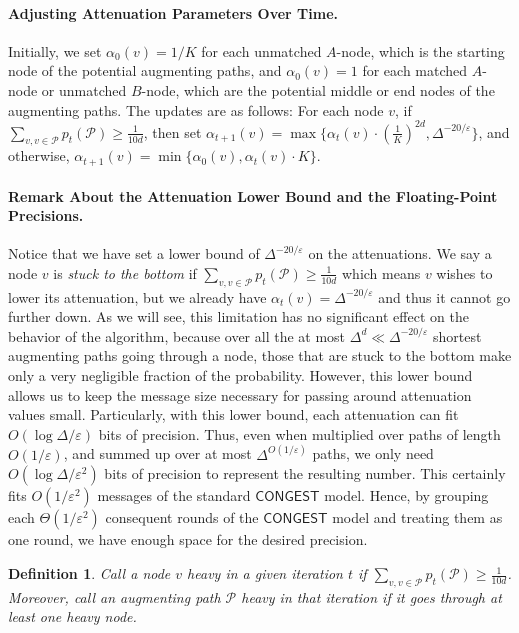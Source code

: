 \documentclass[11pt]{article}
\newtheorem{definition}[theorem]{Definition}
\newcommand{\eps}{\varepsilon}
\begin{document}
\paragraph{Adjusting Attenuation Parameters Over Time.} Initially, we set $\alpha_{0}(v)=1/K$ for each unmatched $A$-node, which is the starting node of the potential augmenting paths, and $\alpha_{0}(v)=1$ for each matched $A$-node or unmatched $B$-node, which are the potential middle or end nodes of the augmenting paths. The updates are as follows: For each node $v$, if $\sum_{v, v\in \mathcal{P}} p_{t}(\mathcal{P}) \geq \frac{1}{10d}$, then set $\alpha_{t+1}(v) = \max\{\alpha_{t}(v) \cdot (\frac{1}{K})^{2d}, \Delta^{-20/\eps}\}$, and otherwise, $\alpha_{t+1}(v) = \min\{\alpha_{0}(v), \alpha_{t}(v) \cdot K\}$.


\paragraph{Remark About the Attenuation Lower Bound and the Floating-Point Precisions.} Notice that we have set a lower bound of $\Delta^{-20/\eps}$ on the attenuations. We say a node $v$ is \emph{stuck to the bottom} if $\sum_{v, v\in \mathcal{P}} p_{t}(\mathcal{P}) \geq \frac{1}{10d}$ which means $v$ wishes to lower its attenuation, but we already have $\alpha_{t}(v)=\Delta^{-20/\eps}$ and thus it cannot go further down. As we will see, this limitation has no significant effect on the behavior of the algorithm, because over all the at most $\Delta^{d} \ll \Delta^{-20/\eps}$ shortest augmenting paths going through a node, those that are stuck to the bottom make only a very negligible fraction of the probability. However, this lower bound allows us to keep the message size necessary for passing around attenuation values small. Particularly, with this lower bound, each attenuation can fit $O(\log \Delta/\eps)$ bits of precision. Thus, even when multiplied over paths of length $O(1/\eps)$, and summed up over at most $\Delta^{O(1/\eps)}$ paths, we only need $O(\log \Delta/\eps^2)$ bits of precision to represent the resulting number. This certainly fits $O(1/\eps^2)$ messages of the standard $\mathsf{CONGEST}$ model. Hence, by grouping each $\Theta(1/\eps^2)$ consequent rounds of the $\mathsf{CONGEST}$ model and treating them as one round, we have enough space for the desired precision.

\begin{definition} Call a node $v$ heavy in a given iteration $t$ if $\sum_{v, v\in \mathcal{P}} p_{t}(\mathcal{P}) \geq \frac{1}{10d}$. Moreover, call an augmenting path $\mathcal{P}$ heavy in that iteration if it goes through at least one heavy node.
\end{definition}
\end{document}
